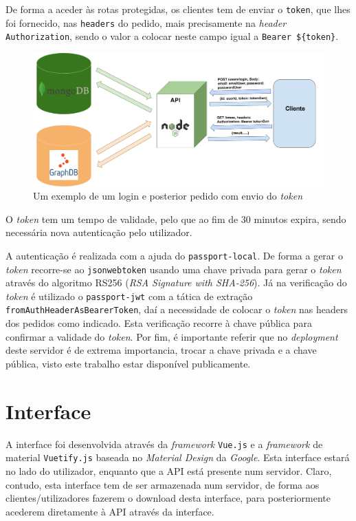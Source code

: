 \documentclass{article}
\begin{document}
De forma a aceder às rotas protegidas, os clientes tem de enviar o \texttt{token}, que lhes foi fornecido, nas \texttt{headers} do pedido, mais precisamente na \textit{header} \texttt{Authorization}, sendo o valor a colocar neste campo igual a \texttt{Bearer \$\{token\}}.

\begin{figure}[H]
    \centering
    \includegraphics[width=15cm]{Pictures/exeAuth.png}
    \caption{Um exemplo de um login e posterior pedido com envio do \textit{token}}
    \label{exe_auth}
\end{figure}

O \textit{token} tem um tempo de validade, pelo que ao fim de 30 minutos expira, sendo necessária nova autenticação pelo utilizador.

A autenticação é realizada com a ajuda do \texttt{passport-local}. De forma a gerar o \textit{token} recorre-se ao \texttt{jsonwebtoken} usando uma chave privada para gerar o \textit{token} através do algoritmo RS256 (\textit{RSA Signature with SHA-256}). Já na verificação do \textit{token} é utilizado o \texttt{passport-jwt} com a tática de extração \texttt{fromAuthHeaderAsBearerToken}, daí a necessidade de colocar o \textit{token} nas headers dos pedidos como indicado. Esta verificação recorre à chave pública para confirmar a validade do \textit{token}. Por fim, é importante referir que no \textit{deployment} deste servidor é de extrema importancia, trocar a chave privada e a chave pública, visto este trabalho estar disponível publicamente.

\section{Interface}

A interface foi desenvolvida através da \textit{framework} \texttt{Vue.js} e a \textit{framework} de material \texttt{Vuetify.js} baseada no \textit{Material Design} da \textit{Google}. Esta interface estará no lado do utilizador, enquanto que a API está presente num servidor. Claro, contudo, esta interface tem de ser armazenada num servidor, de forma aos clientes/utilizadores fazerem o download desta interface, para posteriormente acederem diretamente à API através da interface.
\end{document}

